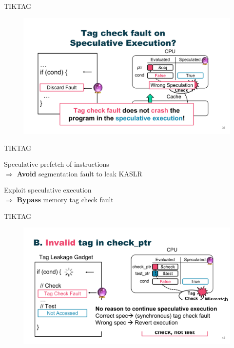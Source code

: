 \documentclass{beamer}
\begin{document}
\begin{frame}{TIKTAG\cite{tiktag}}
    \begin{figure}
        \begin{center}
            \includegraphics[width=1\textwidth]{img/tiktag.pdf}
        \end{center}
    \end{figure} 
\end{frame}

\begin{frame}{TIKTAG\cite{tiktag}}
    \begin{center}
        \Large
        Speculative prefetch of instructions \\
        $\Rightarrow$ \textbf{Avoid} segmentation fault to leak KASLR \\
    \end{center}
    \begin{center}
        \Large
        Exploit speculative execution \\
        $\Rightarrow$ \textbf{Bypass} memory tag check fault
    \end{center}
\end{frame}

\begin{frame}{TIKTAG\cite{tiktag}}
    \begin{figure}
        \begin{center}
            \includegraphics[width=1\textwidth]{img/mte-sc1.pdf}
        \end{center}
    \end{figure} 
\end{frame}
\end{document}
